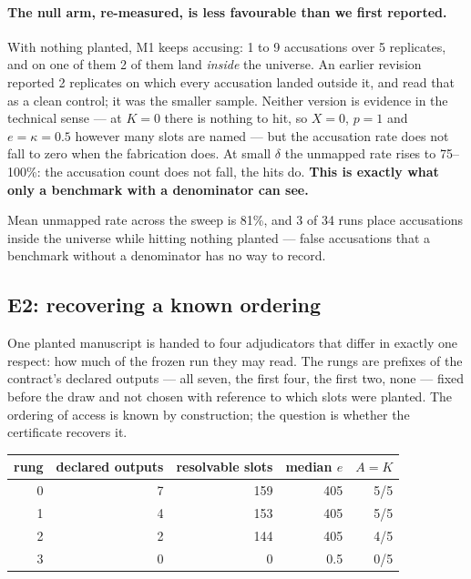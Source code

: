 \documentclass[10pt]{article}
\newcommand{\RM}[1]{{#1}}
\begin{document}
\paragraph{The null arm, re-measured, is less favourable than we first reported.}
With nothing planted, M1 keeps accusing: \RM{1} to \RM{9} accusations over
\RM{5} replicates, and on one of them \RM{2} of them land \emph{inside} the
universe. An earlier revision reported \RM{2} replicates on which every
accusation landed outside it, and read that as a clean control; it was the
smaller sample. Neither version is evidence in the technical sense --- at $K=0$
there is nothing to hit, so $X=\RM{0}$, $p=\RM{1}$ and $e=\kappa=\RM{0.5}$ however many slots are
named --- but the accusation rate does not fall to zero when the fabrication
does. At small $\delta$ the unmapped rate rises to \RM{75--100\%}: the
accusation count does not fall, the hits do. \textbf{This is exactly what only a
benchmark with a denominator can see.}

\noindent Mean unmapped rate across the sweep is \RM{81\%}, and \RM{3} of
\RM{34} runs place accusations inside the universe while hitting nothing
planted --- false accusations that a benchmark without a denominator has no way
to record.


\subsection{E2: recovering a known ordering}
\label{sec:e2}
One planted manuscript is handed to four adjudicators that differ in exactly one
respect: how much of the frozen run they may read. The rungs are prefixes of the
contract's declared outputs --- all seven, the first four, the first two, none
--- fixed before the draw and not chosen with reference to which slots were
planted. The ordering of access is known by construction; the question is
whether the certificate recovers it.

\begin{center}
\small
\begin{tabular}{@{}rrrrr@{}}
\toprule
rung & declared outputs & resolvable slots & median $e$ & $A=K$ \\
\midrule
0 & \RM{7} & \RM{159} & \RM{405} & \RM{5/5} \\
1 & \RM{4} & \RM{153} & \RM{405} & \RM{5/5} \\
2 & \RM{2} & \RM{144} & \RM{405} & \RM{4/5} \\
3 & \RM{0} & \RM{0}   & \RM{0.5} & \RM{0/5} \\
\bottomrule
\end{tabular}
\end{center}
\end{document}
